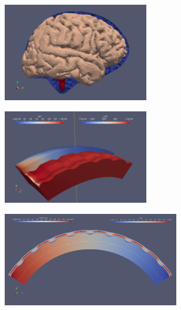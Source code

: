 \documentclass[
	10pt, %
]{beamer}
\begin{document}
\begin{frame}
	\begin{figure}
		\centering
		\begin{subfigure}[b]{0.32\textwidth}
			\centering
			\includegraphics[width=0.70\textwidth]{figures/real_brain_full.png}
			\caption{}
		\end{subfigure}
		\hfill
		\begin{subfigure}[b]{0.32\textwidth}
			\centering
			\includegraphics[width=0.70\textwidth]{figures/3D_profile.png}
			\caption{}
		\end{subfigure}
		\hfill
		\begin{subfigure}[b]{0.32\textwidth}
			\centering
			\includegraphics[width=0.85\textwidth]{figures/2D_view.png}
			\caption{}
		\end{subfigure}
		\hfill
	  \end{figure}

\end{frame}
\end{document}
